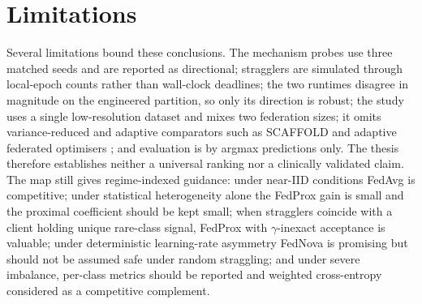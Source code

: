 \documentclass[11pt,a4paper]{report}
\begin{document}
\section{Limitations}
\label{sec:limitations}

Several limitations bound these conclusions. The mechanism probes use three
matched seeds and are reported as directional; stragglers are simulated through
local-epoch counts rather than wall-clock deadlines; the two runtimes disagree in
magnitude on the engineered partition, so only its direction is robust; the study
uses a single low-resolution dataset and mixes two federation sizes; it omits
variance-reduced and adaptive comparators such as SCAFFOLD
\citep{karimireddy2020scaffold} and adaptive federated optimisers
\citep{reddi2021adaptive}; and evaluation is by argmax predictions only. The
thesis therefore establishes neither a universal ranking nor a clinically
validated claim. The map still gives regime-indexed guidance: under near-IID
conditions FedAvg is competitive; under statistical heterogeneity alone the
FedProx gain is small and the proximal coefficient should be kept small; when
stragglers coincide with a client holding unique rare-class signal, FedProx with
$\gamma$-inexact acceptance is valuable; under deterministic learning-rate
asymmetry FedNova is promising but should not be assumed safe under random
straggling; and under severe imbalance, per-class metrics should be reported and
weighted cross-entropy considered as a competitive complement.
\end{document}
